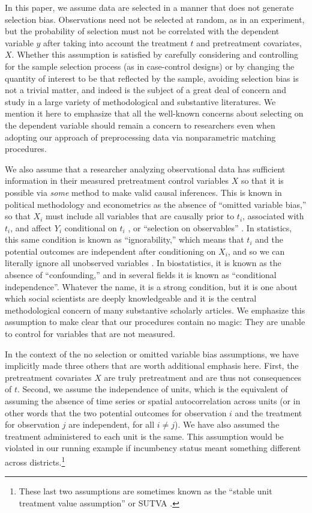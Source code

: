 \documentclass[11pt,titlepage]{article}
\begin{document}
In this paper, we assume data are selected in a manner that does not
generate selection bias.  Observations need not be selected at random,
as in an experiment, but the probability of selection must not be
correlated with the dependent variable $y$ after taking into account
the treatment $t$ and pretreatment covariates, $X$.  Whether this
assumption is satisfied by carefully considering and controlling for
the sample selection process (as in case-control designs) or by
changing the quantity of interest to be that reflected by the sample,
avoiding selection bias is not a trivial matter, and indeed is the
subject of a great deal of concern and study in a large variety of
methodological and substantive literatures.  We mention it here to
emphasize that all the well-known concerns about selecting on the
dependent variable should remain a concern to researchers even when
adopting our approach of preprocessing data via nonparametric matching
procedures.

We also assume that a researcher analyzing observational data has
sufficient information in their measured pretreatment control
variables $X$ so that it is possible via \emph{some} method to make
valid causal inferences.  This is known in political methodology and
econometrics as the absence of ``omitted variable bias,'' so that
$X_i$ must include all variables that are causally prior to $t_i$,
associated with $t_i$, and affect $Y_i$ conditional on $t_i$
\citep{Goldberger91,KinKeoVer94}, or ``selection on observables''
\citep{HecRob85}.  In statistics, this same condition is known as
``ignorability,'' which means that $t_i$ and the potential outcomes
are independent after conditioning on $X_i$, and so we can literally
ignore all unobserved variables \citep{RosRub83}.  In biostatistics,
it is known as the absence of ``confounding,'' and in several fields
it is known as ``conditional independence''.  Whatever the name, it is
a strong condition, but it is one about which social scientists are
deeply knowledgeable and it is the central methodological concern of
many substantive scholarly articles.  We emphasize this assumption to
make clear that our procedures contain no magic: They are unable to
control for variables that are not measured.

In the context of the no selection or omitted variable bias
assumptions, we have implicitly made three others that are worth
additional emphasis here.  First, the pretreatment covariates $X$ are
truly pretreatment and are thus not consequences of $t$.  Second, we
assume the independence of units, which is the equivalent of assuming
the absence of time series or spatial autocorrelation across units (or
in other words that the two potential outcomes for observation $i$ and
the treatment for observation $j$ are independent, for all $i\not=j$).
We have also assumed the treatment administered to each unit is the
same.  This assumption would be violated in our running example if
incumbency status meant something different across
districts.\footnote{These last two assumptions are sometimes known as
  the ``stable unit treatment value assumption'' or SUTVA
  \citep{Rubin74}.}
\end{document}
